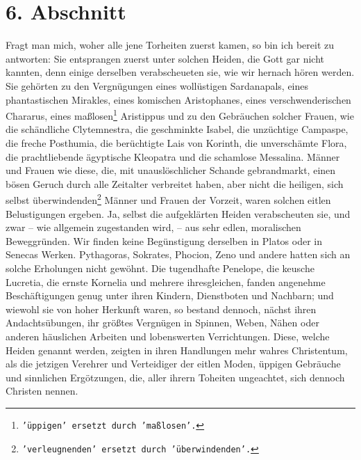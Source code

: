 \section{6. Abschnitt} \label{kap17_ab6}

Fragt man mich, woher alle jene Torheiten zuerst kamen, so bin ich bereit zu
antworten: Sie entsprangen zuerst unter solchen Heiden, die Gott gar nicht
kannten, denn einige derselben verabscheueten sie, wie wir hernach hören werden.
Sie gehörten zu den Vergnügungen eines wollüstigen
Sardanapals, eines
phantastischen Mirakles, eines komischen
Aristophanes, eines verschwenderischen
Chararus, eines maßlosen\footnote{\texttt{'üppigen'
ersetzt durch 'maßlosen'.}}
Aristippus und zu den Gebräuchen solcher Frauen, wie
die
schändliche Clytemnestra, die geschminkte
Isabel, die unzüchtige
Campaspe, die
freche Posthumia, die berüchtigte Lais von
Korinth, die unverschämte Flora, die
prachtliebende ägyptische Kleopatra und die schamlose
Messalina. Männer und
Frauen wie diese, die, mit unauslöschlicher Schande gebrandmarkt, einen bösen
Geruch durch alle Zeitalter verbreitet haben, aber nicht die heiligen, sich
selbst überwindenden\footnote{\texttt{'verleugnenden' ersetzt durch
'überwindenden'.}} Männer und
Frauen der Vorzeit, waren solchen eitlen
Belustigungen ergeben. Ja, selbst die aufgeklärten
Heiden verabscheuten sie,
und zwar -- wie allgemein zugestanden wird, -- aus sehr edlen, moralischen
Beweggründen. Wir finden keine Begünstigung derselben in
Platos oder in
Senecas Werken. Pythagoras,
Sokrates, Phocion,
Zeno und andere hatten sich an
solche Erholungen nicht gewöhnt. Die tugendhafte
Penelope, die keusche
Lucretia, die ernste
Kornelia und mehrere ihresgleichen, fanden angenehme
Beschäftigungen genug unter ihren Kindern, Dienstboten und Nachbarn; und wiewohl
sie von hoher Herkunft waren, so bestand dennoch, nächst ihren Andachtsübungen,
ihr größtes Vergnügen in Spinnen, Weben, Nähen oder anderen häuslichen Arbeiten
und lobenswerten Verrichtungen. Diese, welche Heiden genannt werden, zeigten
in ihren Handlungen mehr wahres Christentum, als die jetzigen Verehrer und
Verteidiger der eitlen Moden, üppigen Gebräuche und sinnlichen Ergötzungen,
die, aller ihrern Toheiten ungeachtet, sich dennoch Christen nennen.

